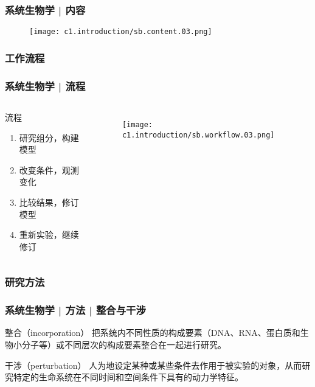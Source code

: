 \begin{frame}
  \frametitle{系统生物学 | 内容}
  \begin{figure}
    \centering
    \texttt{[image: c1.introduction/sb.content.03.png]}
  \end{figure}
\end{frame}

\subsubsection{工作流程}
\begin{frame}
  \frametitle{系统生物学 | 流程}
  \begin{columns}
    \begin{block}{流程}
  \begin{enumerate}
    \item 研究组分，构建模型
    \item 改变条件，观测变化
    \item 比较结果，修订模型
    \item 重新实验，继续修订
  \end{enumerate}
    \end{block}
  \begin{figure}
    \centering
    \texttt{[image: c1.introduction/sb.workflow.03.png]}
  \end{figure}
  \end{columns}
\end{frame}

\subsubsection{研究方法}
\begin{frame}
  \frametitle{系统生物学 | 方法 | 整合与干涉}
  \begin{block}{整合（incorporation）}
把系统内不同性质的构成要素（DNA、RNA、蛋白质和生物小分子等）或不同层次的构成要素整合在一起进行研究。
  \end{block}
  \pause
  \begin{block}{干涉（perturbation）}
人为地设定某种或某些条件去作用于被实验的对象，从而研究特定的生命系统在不同时间和空间条件下具有的动力学特征。
  \end{block}
\end{frame}

